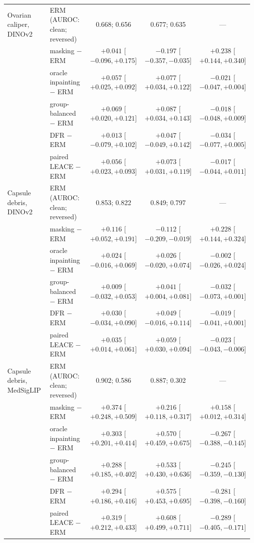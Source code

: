 {\begin{longtable}{p{2.6cm}p{3.2cm}ccc}
Ovarian caliper, DINOv2 & ERM (AUROC: clean; reversed) & 0.668; 0.656 & 0.677; 0.635 & --- \\
 & masking $-$ ERM & $+0.041$ [$-0.096, +0.175$] & $-0.197$ [$-0.357, -0.035$] & $+0.238$ [$+0.144, +0.340$] \\
 & oracle inpainting $-$ ERM & $+0.057$ [$+0.025, +0.092$] & $+0.077$ [$+0.034, +0.122$] & $-0.021$ [$-0.047, +0.004$] \\
 & group-balanced $-$ ERM & $+0.069$ [$+0.020, +0.121$] & $+0.087$ [$+0.034, +0.143$] & $-0.018$ [$-0.048, +0.009$] \\
 & DFR $-$ ERM & $+0.013$ [$-0.079, +0.102$] & $+0.047$ [$-0.049, +0.142$] & $-0.034$ [$-0.077, +0.005$] \\
 & paired LEACE $-$ ERM & $+0.056$ [$+0.023, +0.093$] & $+0.073$ [$+0.031, +0.119$] & $-0.017$ [$-0.044, +0.011$] \\
Capsule debris, DINOv2 & ERM (AUROC: clean; reversed) & 0.853; 0.822 & 0.849; 0.797 & --- \\
 & masking $-$ ERM & $+0.116$ [$+0.052, +0.191$] & $-0.112$ [$-0.209, -0.019$] & $+0.228$ [$+0.144, +0.324$] \\
 & oracle inpainting $-$ ERM & $+0.024$ [$-0.016, +0.069$] & $+0.026$ [$-0.020, +0.074$] & $-0.002$ [$-0.026, +0.024$] \\
 & group-balanced $-$ ERM & $+0.009$ [$-0.032, +0.053$] & $+0.041$ [$+0.004, +0.081$] & $-0.032$ [$-0.073, +0.001$] \\
 & DFR $-$ ERM & $+0.030$ [$-0.034, +0.090$] & $+0.049$ [$-0.016, +0.114$] & $-0.019$ [$-0.041, +0.001$] \\
 & paired LEACE $-$ ERM & $+0.035$ [$+0.014, +0.061$] & $+0.059$ [$+0.030, +0.094$] & $-0.023$ [$-0.043, -0.006$] \\
Capsule debris, MedSigLIP & ERM (AUROC: clean; reversed) & 0.902; 0.586 & 0.887; 0.302 & --- \\
 & masking $-$ ERM & $+0.374$ [$+0.248, +0.509$] & $+0.216$ [$+0.118, +0.317$] & $+0.158$ [$+0.012, +0.314$] \\
 & oracle inpainting $-$ ERM & $+0.303$ [$+0.201, +0.414$] & $+0.570$ [$+0.459, +0.675$] & $-0.267$ [$-0.388, -0.145$] \\
 & group-balanced $-$ ERM & $+0.288$ [$+0.185, +0.402$] & $+0.533$ [$+0.430, +0.636$] & $-0.245$ [$-0.359, -0.130$] \\
 & DFR $-$ ERM & $+0.294$ [$+0.186, +0.416$] & $+0.575$ [$+0.453, +0.695$] & $-0.281$ [$-0.398, -0.160$] \\
 & paired LEACE $-$ ERM & $+0.319$ [$+0.212, +0.433$] & $+0.608$ [$+0.499, +0.711$] & $-0.289$ [$-0.405, -0.171$] \\

\end{longtable}}
